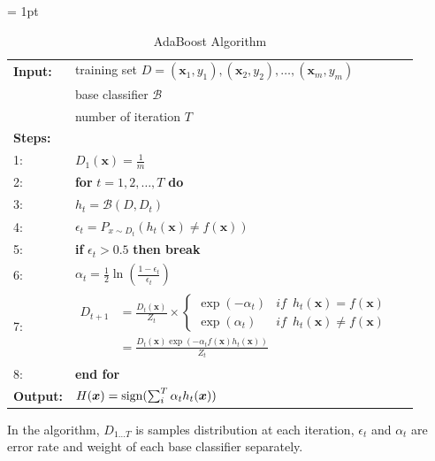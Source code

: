 \documentclass[journal, a4paper]{IEEEtran}
\begin{document}
\begin{table}[!hbt]
  \centering
  \caption{AdaBoost Algorithm}
  \label{tab:adabost}
  \tabcolsep = 1pt
  \begin{tabular}{lll}
    \hline
    \textbf{Input:} & training set $D={(\bm{x}_1,y_1),(\bm{x}_2,y_2),\dots,(\bm{x}_m,y_m)}$ \\
     & base classifier $\mathcal{B}$ \\
     & number of iteration $T$ \\
    \textbf{Steps:} &  \\
    1: & $D_1(\bm{x})=\frac{1}{m}$ \\
    2: & \textbf{for} $t=1,2,\dots,T$ \textbf{do} \\
    3: & \qquad{}$h_t=\mathcal{B}(D,D_t)$ \\
    4: & \qquad{}$\epsilon_t=P_{x\sim{}D_t}(h_t(\bm{x})\neq f(\bm{x}))$ \\
    5: & \qquad{}\textbf{if} $\epsilon_t > 0.5$ \textbf{then break} \\
    6: & \qquad{}$\alpha_t=\frac{1}{2}\ln{(\frac{1-\epsilon_t}{\epsilon_t})}$ \\
    7: & \qquad{}$
                 \begin{aligned}
                    D_{t+1} & = \frac{D_t(\bm{x})}{Z_t} \times \left\{\begin{array}{ll}
                                                                        \exp{(-\alpha_t)}&\textit{if}\enspace h_t(\bm{x})=f(\bm{x}) \\
                                                                        \exp{(\alpha_t)}&\textit{if}\enspace h_t(\bm{x})\neq{}f(\bm{x})
                                                                      \end{array}\right. \\
                            & = \frac{D_t(\bm{x})\exp{(-\alpha_tf(\bm{x})h_t(\bm{x}))}}{Z_t}
                 \end{aligned}
                 $ \\
    8: & \textbf{end for} \\
    \textbf{Output:} & $H(\bm{x})= \textup{sign}(\sum_i^T{\alpha_th_t(\bm{x})})$ \\
    \hline
  \end{tabular}
\end{table}
In the algorithm, $D_{1\dots T}$ is samples distribution at each iteration, $\epsilon_t$ and $\alpha_t$ are error rate and weight of each base classifier separately.
\end{document}
